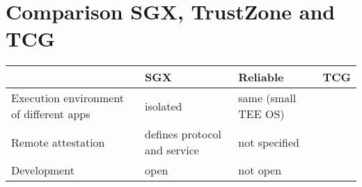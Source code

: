 
\section{Comparison SGX, TrustZone and TCG}
\begin{tabular}{@{}llll@{}}
\toprule
                & SGX & Reliable & TCG  \\ \midrule
  Execution environment of different apps & isolated            & same (small
  TEE OS)          &  \\
Remote attestation & defines protocol and service            & not specified          &  \\
Development    & open            & not open          &  \\ \bottomrule
\end{tabular}
